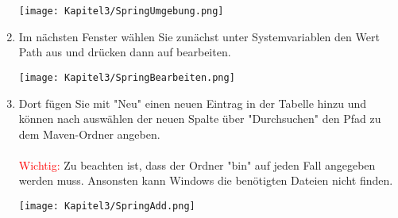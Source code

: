 \begin{enumerate}
    \begin{center}
        \begin{minipage}[t]{0.5\textwidth}
            \centering
            \texttt{[image: Kapitel3/SpringUmgebung.png]}
            \label{ContainerConfig}
        \end{minipage}
    \end{center}

    \item Im nächsten Fenster wählen Sie zunächst unter Systemvariablen den Wert Path aus und drücken dann auf bearbeiten.
    
    \begin{center}
        \begin{minipage}[t]{0.5\textwidth}
            \centering
            \texttt{[image: Kapitel3/SpringBearbeiten.png]}
            \label{ContainerConfig}
        \end{minipage}
    \end{center}

    
    \item Dort fügen Sie mit "Neu"{} einen neuen Eintrag in der Tabelle hinzu und können nach auswählen der neuen Spalte über "Durchsuchen"{} den Pfad zu dem Maven-Ordner angeben.\\\\\textcolor{red}{Wichtig:} Zu beachten ist, dass der Ordner "bin"{} auf jeden Fall angegeben werden muss. Ansonsten kann Windows die benötigten Dateien nicht finden.

    \begin{center}
        \begin{minipage}[t]{0.5\textwidth}
            \centering
            \texttt{[image: Kapitel3/SpringAdd.png]}
            \label{ContainerConfig}
        \end{minipage}
    \end{center}
\end{enumerate}

